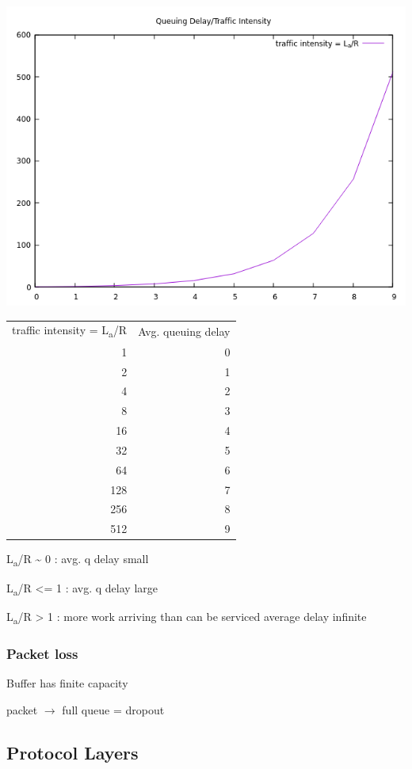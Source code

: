 \documentclass[11pt]{article}
\begin{document}
\begin{center}
\includegraphics[width=.9\linewidth]{../img/qDelay.png}
\end{center}

\begin{center}
\begin{tabular}{rr}
traffic intensity = L\textsubscript{a}/R & Avg. queuing delay\\
1 & 0\\
2 & 1\\
4 & 2\\
8 & 3\\
16 & 4\\
32 & 5\\
64 & 6\\
128 & 7\\
256 & 8\\
512 & 9\\
\end{tabular}
\end{center}


L\textsubscript{a}/R \textasciitilde{} 0 : avg. q delay small

L\textsubscript{a}/R <= 1 : avg. q delay large

L\textsubscript{a}/R > 1 : more work arriving than can be serviced average delay
infinite

\subsubsection{Packet loss}
\label{sec:orgc55672c}
Buffer has finite capacity 

packet \(\rightarrow\) full queue = dropout


\subsection{Protocol Layers}
\label{sec:org3e37e9a}
\end{document}
